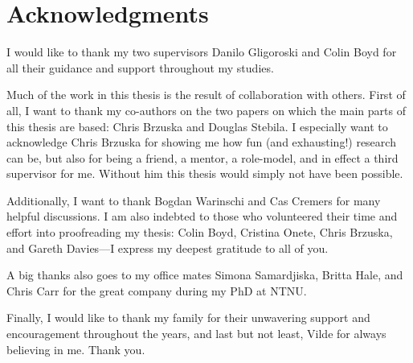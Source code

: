\chapter*{Acknowledgments}\label{sec:acknowledgment}


I would like to thank my two supervisors Danilo Gligoroski and Colin Boyd for all their guidance and support throughout my studies.
%


Much of the work in this thesis is the result of collaboration with others.
First of all, I want to thank my co-authors on the two papers on which the main parts of this thesis are based:
Chris Brzuska and Douglas Stebila.
I especially want to acknowledge Chris Brzuska for showing me how fun (and exhausting!) research can be,
but also for being a friend, a mentor, a role-model, and in effect a third supervisor for me.
Without him this thesis would simply not have been possible.

Additionally,
I want to thank Bogdan Warinschi and Cas Cremers for many helpful discussions.
I am also indebted to those who volunteered their time and effort into proofreading my thesis:
Colin Boyd, Cristina Onete, Chris Brzuska, and Gareth Davies---I express my deepest gratitude to all of you.



A big thanks also goes to my office mates Simona Samardjiska, Britta Hale, and Chris Carr for the great company during my PhD at NTNU.

Finally,
I would like to thank my family for their unwavering support and encouragement throughout the years,
and last but not least, Vilde for always believing in me. Thank you.
